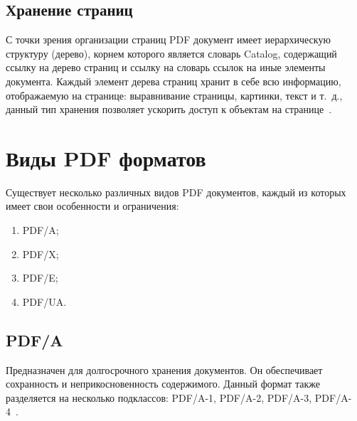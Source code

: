\subsection{Хранение страниц}
С точки зрения организации  страниц PDF документ имеет иерархическую структуру (дерево), корнем которого является словарь
Catalog, содержащий ссылку на дерево страниц и ссылку на словарь ссылок на иные элементы документа.
Каждый элемент дерева страниц хранит в себе всю информацию, отображаемую на странице:
выравнивание страницы, картинки, текст и т.~д., данный тип хранения позволяет ускорить доступ к объектам на странице~\cite{pdf_object_def,pdf_tree}.


\section{Виды PDF форматов}
Существует несколько различных видов PDF документов, каждый из которых имеет свои особенности и ограничения:
\begin{enumerate}
	\item PDF/A;
	\item PDF/X;
	\item PDF/E;
	\item PDF/UA.
\end{enumerate}

\subsection{PDF/A}

Предназначен для долгосрочного хранения документов. Он обеспечивает сохранность и неприкосновенность содержимого.
Данный формат также разделяется на несколько подклассов: PDF/A-1, PDF/A-2, PDF/A-3, PDF/A-4~\cite{pdf_levels_std}.



